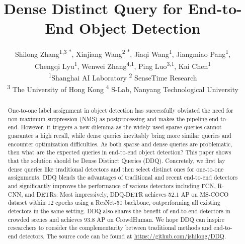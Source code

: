 \documentclass[10pt,twocolumn,letterpaper]{article}
\begin{document}
\title{ Dense Distinct Query for End-to-End Object Detection}



\author{Shilong Zhang\textsuperscript{\rm 1,3 *},  \space\space
        Xinjiang Wang\textsuperscript{\rm 2 *},\space\space
        Jiaqi Wang\textsuperscript{\rm 1},\space\space
        Jiangmiao Pang\textsuperscript{\rm 1}, \\
        Chengqi Lyu\textsuperscript{\rm 1},\space\space
        Wenwei Zhang\textsuperscript{\rm 4,1},\space\space
        Ping Luo\textsuperscript{\rm 3,1},\space\space
        Kai Chen\textsuperscript{\rm 1}\\
        \small
        \textsuperscript{\rm 1}Shanghai AI Laboratory  \space \space
        \small\textsuperscript{\rm 2} SenseTime Research \\
        \small\textsuperscript{\rm 3} The University of Hong Kong \space \space
        \small\textsuperscript{\rm 4} S-Lab, Nanyang Technological University  \\
}




\twocolumn[{
\maketitle  
\vspace{-14mm}
\centering

\begin{figure}[H]
\hspace{6mm}
\hsize=\textwidth
\texttt{[image: latex/resources/fig1v8.pdf]} 
\caption{Pros and Cons of different queries and their corresponding learning paradigms. }
\label{fig:framework}
\end{figure}
}]

\begin{abstract} One-to-one label assignment in object detection has successfully obviated the need for non-maximum suppression (NMS) as postprocessing and makes the pipeline end-to-end. However, it triggers a new dilemma as the widely used sparse queries cannot guarantee a high recall, while dense queries inevitably bring more similar queries and encounter optimization difficulties. As both sparse and dense queries are problematic, then what are the expected queries in end-to-end object detection? This paper shows that the solution should be Dense Distinct Queries (DDQ). Concretely, we first lay dense queries like traditional detectors and then select distinct ones for one-to-one assignments. DDQ blends the advantages of traditional and recent end-to-end detectors and significantly improves the performance of various detectors including FCN, R-CNN, and DETRs. Most impressively, DDQ-DETR achieves 52.1 AP on MS-COCO dataset within 12 epochs using a ResNet-50 backbone, outperforming all existing detectors in the same setting. DDQ also shares the benefit of end-to-end detectors in crowded scenes and achieves 93.8 AP on CrowdHuman. We hope DDQ can inspire researchers to consider the complementarity between traditional methods and end-to-end detectors.  The source code can be found at \url{https://github.com/jshilong/DDQ}.

\end{abstract}
\end{document}
